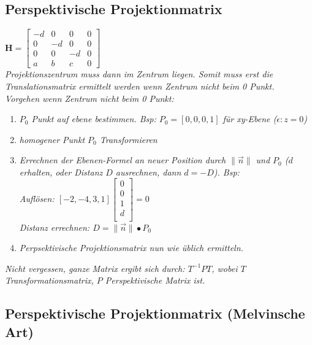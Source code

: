 \subsection{Perspektivische Projektionmatrix}

$\mathbf{H} = \begin{bmatrix}
    -d & 0 & 0 & 0 \\
    0 & -d & 0 & 0 \\
    0 & 0 & -d & 0 \\
    a & b & c & 0
\end{bmatrix}$ \\

\textit{Projektionszentrum muss dann im Zentrum liegen.
Somit muss erst die Translationsmatrix ermittelt werden wenn Zentrum nicht beim 0 Punkt.}\\

\textit{Vorgehen wenn Zentrum nicht beim 0 Punkt:}\\
\begin{enumerate}
    \item \textit{$P_0$ Punkt auf ebene bestimmen. Bsp: $P_0 = [0,0,0,1]$ für xy-Ebene ($\epsilon: z=0$)}
    \item \textit{homogener Punkt $P_0$ Transformieren}
    \item \textit{Errechnen der Ebenen-Formel an neuer Position durch
    $\|\vec{n}\|$ und $P_0$ ($d$ erhalten, oder Distanz $D$ ausrechnen, dann $d=-D$). Bsp:} \\
    \textit{Auflösen:
    $[-2, -4, 3, 1] \begin{bmatrix}
        0 \\ 0 \\ 1 \\ d \\
    \end{bmatrix} = 0$ \\
    }
    \textit{Distanz errechnen: $D = \|\vec{n}\| \bullet P_0$}

    \item \textit{Perpsektivische Projektionsmatrix nun wie üblich ermitteln.}
\end{enumerate}

\textit{Nicht vergessen, ganze Matrix ergibt sich durch: $T^{-1}PT$,
wobei $T$ Transformationsmatrix, $P$ Perspektivische Matrix ist.}

\subsection{Perspektivische Projektionmatrix (Melvinsche Art)}

